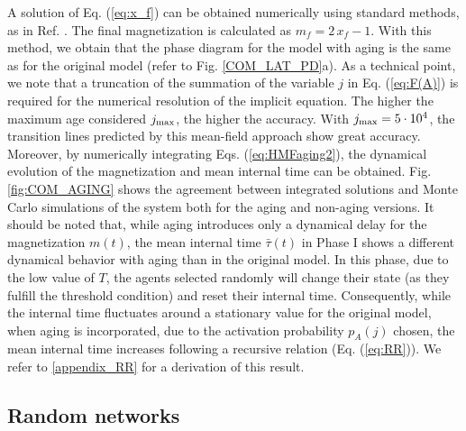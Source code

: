 A solution of Eq. (\ref{eq:x_f}) can be obtained numerically using standard methods, as in Ref. \cite{chen-2020}. The final magnetization is calculated as $m_f = 2 \,x_f - 1$. With this method, we obtain that the phase diagram for the model with aging is the same as for the original model (refer to Fig. \ref{COM_LAT_PD}a). As a technical point, we note that a truncation of the summation of the variable $j$ in Eq. (\ref{eq:F(A)}) is required for the numerical resolution of the implicit equation. The higher the maximum age considered $j_{\rm max}$, the higher the accuracy. With $j_{\rm max} = 5 \cdot 10^4$, the transition lines predicted by this mean-field approach show great accuracy. Moreover, by numerically integrating Eqs. (\ref{eq:HMFaging2}), the dynamical evolution of the magnetization and mean internal time can be obtained. Fig. \ref{fig:COM_AGING} shows the agreement between integrated solutions and Monte Carlo simulations of the system both for the aging and non-aging versions. It should be noted that, while aging introduces only a dynamical delay for the magnetization $m(t)$, the mean internal time $\bar{\tau}(t)$ in Phase I shows a different dynamical behavior with aging than in the original model. In this phase, due to the low value of $T$, the agents selected randomly will change their state (as they fulfill the threshold condition) and reset their internal time. Consequently, while the internal time fluctuates around a stationary value for the original model, when aging is incorporated, due to the activation probability $p_A(j)$ chosen, the mean internal time increases following a recursive relation (Eq. (\ref{eq:RR})). We refer to \ref{appendix_RR} for a derivation of this result.

\subsection{\label{sec:Complex networks aging} Random networks}

